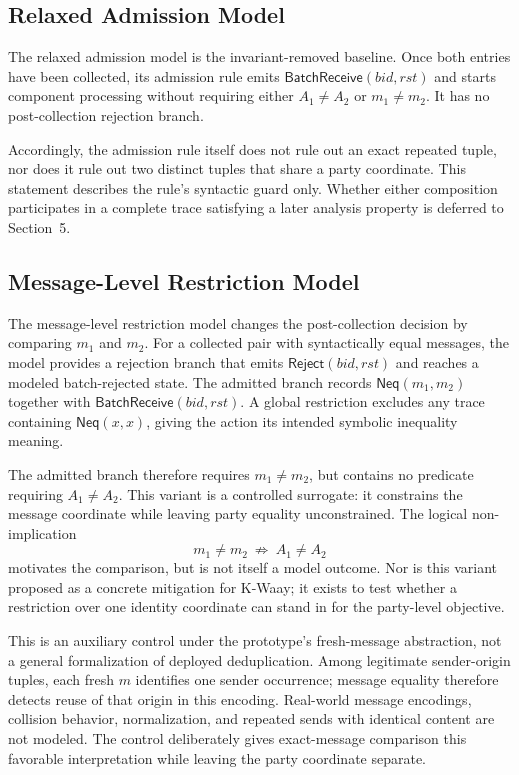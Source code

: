 \subsection{Relaxed Admission Model}

The relaxed admission model is the invariant-removed baseline. Once both
entries have been collected, its admission rule emits
\(\mathsf{BatchReceive}(\mathit{bid},\mathit{rst})\) and starts component
processing without requiring either $A_1\neq A_2$ or $m_1\neq m_2$. It has no
post-collection rejection branch.

Accordingly, the admission rule itself does not rule out an exact repeated
tuple, nor does it rule out two distinct tuples that share a party coordinate.
This statement describes the rule's syntactic guard only. Whether either
composition participates in a complete trace satisfying a later analysis
property is deferred to Section~5.

\subsection{Message-Level Restriction Model}

The message-level restriction model changes the post-collection decision by
comparing $m_1$ and $m_2$. For a collected pair with syntactically equal
messages, the model provides a rejection branch that emits
\(\mathsf{Reject}(\mathit{bid},\mathit{rst})\) and reaches a modeled
batch-rejected state. The admitted branch records
\(\mathsf{Neq}(m_1,m_2)\) together with
\(\mathsf{BatchReceive}(\mathit{bid},\mathit{rst})\). A global restriction
excludes any trace containing \(\mathsf{Neq}(x,x)\), giving the action its
intended symbolic inequality meaning.

The admitted branch therefore requires $m_1\neq m_2$, but contains no
predicate requiring $A_1\neq A_2$. This variant is a controlled surrogate: it
constrains the message coordinate while leaving party equality unconstrained.
The logical non-implication
\[
  m_1\neq m_2
  \ \not\Longrightarrow\ 
  A_1\neq A_2
\]
motivates the comparison, but is not itself a model outcome. Nor is this
variant proposed as a concrete mitigation for K-Waay; it exists to test
whether a restriction over one identity coordinate can stand in for the
party-level objective.

This is an auxiliary control under the prototype's fresh-message abstraction,
not a general formalization of deployed deduplication. Among legitimate
sender-origin tuples, each fresh $m$ identifies one sender occurrence; message
equality therefore detects reuse of that origin in this encoding. Real-world
message encodings, collision behavior, normalization, and repeated sends with
identical content are not modeled. The control deliberately gives exact-message
comparison this favorable interpretation while leaving the party coordinate
separate.

